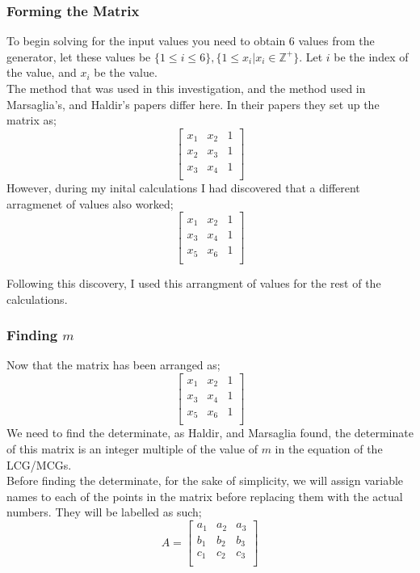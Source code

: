 \documentclass[12pft, english]{article}
\begin{document}
\begin{multicols}{2}
  \subsubsection{Forming the Matrix}
  To begin solving for the input values you need to obtain 6 values from the generator, let these values be \( \{ 1 \leq i \leq 6 \} , \{1 \leq x_{i} | x_{i} \in \mathbb{Z}^{+}\} \). Let \( i \) be the index of the value, and \( x_{i}\) be the value. \\
  The method that was used in this investigation, and the method used in Marsaglia's, and Haldir's papers differ here. In their papers they set up the matrix as; \citep{fallOntoPlanes} \citep{reteamHal}
    \[
    \begin{bmatrix}
      x_{1} & x_{2} & 1 \\
      x_{2} & x_{3} & 1 \\
      x_{3} & x_{4} & 1 \\
    \end{bmatrix}
  \]
    However, during my inital calculations I had discovered that a different arragmenet of values also worked;
  \[
    \begin{bmatrix}
      x_{1} & x_{2} & 1 \\
      x_{3} & x_{4} & 1 \\
      x_{5} & x_{6} & 1 \\
    \end{bmatrix}
  \]

  Following this discovery, I used this arrangment of values for the rest of the calculations.

  \subsubsection{Finding \(m\)}
  Now that the matrix has been arranged as;
 \[
    \begin{bmatrix}
      x_{1} & x_{2} & 1 \\
      x_{3} & x_{4} & 1 \\
      x_{5} & x_{6} & 1 \\
    \end{bmatrix}
  \]
  We need to find the determinate, as Haldir, and Marsaglia found, the determinate of this matrix is an integer multiple of the value of \(m\) in the equation of the LCG/MCGs. \\
  Before finding the determinate, for the sake of simplicity, we will assign variable names to each of the points in the matrix before replacing them with the actual numbers. They will be labelled as such;
  \[
    A =
    \begin{bmatrix}
      a_{1} & a_{2} & a_{3} \\
      b_{1} & b_{2} & b_{3} \\
      c_{1} & c_{2} & c_{3} \\
    \end{bmatrix}
  \]


\end{multicols}
\end{document}
